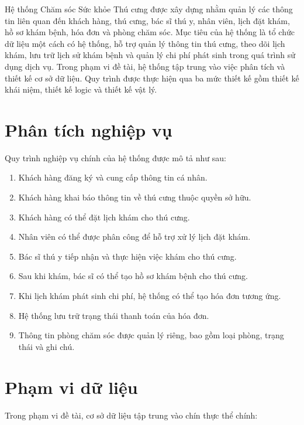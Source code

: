Hệ thống Chăm sóc Sức khỏe Thú cưng được xây dựng nhằm quản lý các thông tin liên quan đến khách hàng, thú cưng, bác sĩ thú y, nhân viên, lịch đặt khám, hồ sơ khám bệnh, hóa đơn và phòng chăm sóc.
Mục tiêu của hệ thống là tổ chức dữ liệu một cách có hệ thống, hỗ trợ quản lý thông tin thú cưng, theo dõi lịch khám, lưu trữ lịch sử khám bệnh và quản lý chi phí phát sinh trong quá trình sử dụng dịch vụ.
Trong phạm vi đề tài, hệ thống tập trung vào việc phân tích và thiết kế cơ sở dữ liệu. Quy trình được thực hiện qua ba mức thiết kế gồm thiết kế khái niệm, thiết kế logic và thiết kế vật lý.

\section{Phân tích nghiệp vụ}

Quy trình nghiệp vụ chính của hệ thống được mô tả như sau:

\begin{enumerate}
    \item Khách hàng đăng ký và cung cấp thông tin cá nhân.
    \item Khách hàng khai báo thông tin về thú cưng thuộc quyền sở hữu.
    \item Khách hàng có thể đặt lịch khám cho thú cưng.
    \item Nhân viên có thể được phân công để hỗ trợ xử lý lịch đặt khám.
    \item Bác sĩ thú y tiếp nhận và thực hiện việc khám cho thú cưng.
    \item Sau khi khám, bác sĩ có thể tạo hồ sơ khám bệnh cho thú cưng.
    \item Khi lịch khám phát sinh chi phí, hệ thống có thể tạo hóa đơn tương ứng.
    \item Hệ thống lưu trữ trạng thái thanh toán của hóa đơn.
    \item Thông tin phòng chăm sóc được quản lý riêng, bao gồm loại phòng, trạng thái và ghi chú.
\end{enumerate}

\section{Phạm vi dữ liệu}

Trong phạm vi đề tài, cơ sở dữ liệu tập trung vào chín thực thể chính:

